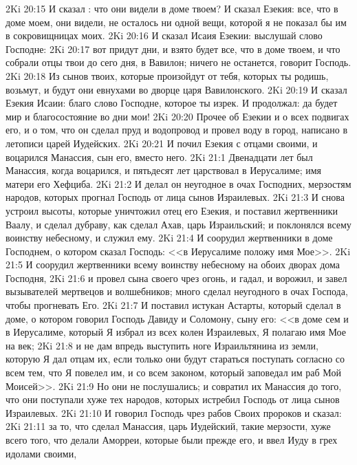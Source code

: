 \vs 2Ki 20:15 И сказал : что они видели в доме твоем? И сказал Езекия: все, что в доме моем, они видели, не осталось ни одной вещи, которой я не показал бы им в сокровищницах моих.
\vs 2Ki 20:16 И сказал Исаия Езекии: выслушай слово Господне:
\vs 2Ki 20:17 вот придут дни, и взято будет все, что в доме твоем, и что собрали отцы твои до сего дня, в Вавилон; ничего не останется, говорит Господь.
\vs 2Ki 20:18 Из сынов твоих, которые произойдут от тебя, которых ты родишь, возьмут, и будут они евнухами во дворце царя Вавилонского.
\vs 2Ki 20:19 И сказал Езекия Исаии: благо слово Господне, которое ты изрек. И продолжал: да будет мир и благосостояние во дни мои!
\rsbpar\vs 2Ki 20:20 Прочее об Езекии и о всех подвигах его, и о том, что он сделал пруд и водопровод и провел воду в город, написано в летописи царей Иудейских.
\vs 2Ki 20:21 И почил Езекия с отцами своими, и воцарился Манассия, сын его, вместо него.
\vs 2Ki 21:1 Двенадцати лет был Манассия, когда воцарился, и пятьдесят лет царствовал в Иерусалиме; имя матери его Хефциба.
\vs 2Ki 21:2 И делал он неугодное в очах Господних,  мерзостям народов, которых прогнал Господь от лица сынов Израилевых.
\vs 2Ki 21:3 И снова устроил высоты, которые уничтожил отец его Езекия, и поставил жертвенники Ваалу, и сделал дубраву, как сделал Ахав, царь Израильский; и поклонялся всему воинству небесному, и служил ему.
\vs 2Ki 21:4 И соорудил жертвенники в доме Господнем, о котором сказал Господь: <<в Иерусалиме положу имя Мое>>.
\vs 2Ki 21:5 И соорудил жертвенники всему воинству небесному на обоих дворах дома Господня,
\vs 2Ki 21:6 и провел сына своего чрез огонь, и гадал, и ворожил, и завел вызывателей мертвецов и волшебников; много сделал неугодного в очах Господа, чтобы прогневать Его.
\vs 2Ki 21:7 И поставил истукан Астарты, который сделал в доме, о котором говорил Господь Давиду и Соломону, сыну его: <<в доме сем и в Иерусалиме, который Я избрал из всех колен Израилевых, Я полагаю имя Мое на век;
\vs 2Ki 21:8 и не дам впредь выступить ноге Израильтянина из земли, которую Я дал отцам их, если только они будут стараться поступать согласно со всем тем, что Я повелел им, и со всем законом, который заповедал им раб Мой Моисей>>.
\vs 2Ki 21:9 Но они не послушались; и совратил их Манассия до того, что они поступали хуже тех народов, которых истребил Господь от лица сынов Израилевых.
\rsbpar\vs 2Ki 21:10 И говорил Господь чрез рабов Своих пророков и сказал:
\vs 2Ki 21:11 за то, что сделал Манассия, царь Иудейский, такие мерзости, хуже всего того, что делали Аморреи, которые были прежде его, и ввел Иуду в грех идолами своими,

